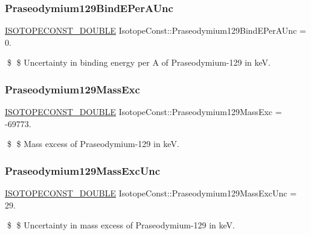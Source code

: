 \subsubsection{\texorpdfstring{Praseodymium129\+Bind\+E\+Per\+A\+Unc}{Praseodymium129BindEPerAUnc}}
{\footnotesize\ttfamily \mbox{\hyperlink{group___isotope_const-_macros_ga8f45a7272ce02c0b4c65c44636ed719a}{I\+S\+O\+T\+O\+P\+E\+C\+O\+N\+S\+T\+\_\+\+D\+O\+U\+B\+LE}} Isotope\+Const\+::\+Praseodymium129\+Bind\+E\+Per\+A\+Unc = 0.}

\$ \$ Uncertainty in binding energy per A of Praseodymium-\/129 in keV. \mbox{\label{group___isotope_const-_praseodymium-_pr129_gaf398c78a06831234ea2d2b014be75fe1}} 
\subsubsection{\texorpdfstring{Praseodymium129\+Mass\+Exc}{Praseodymium129MassExc}}
{\footnotesize\ttfamily \mbox{\hyperlink{group___isotope_const-_macros_ga8f45a7272ce02c0b4c65c44636ed719a}{I\+S\+O\+T\+O\+P\+E\+C\+O\+N\+S\+T\+\_\+\+D\+O\+U\+B\+LE}} Isotope\+Const\+::\+Praseodymium129\+Mass\+Exc = -\/69773.}

\$ \$ Mass excess of Praseodymium-\/129 in keV. \mbox{\label{group___isotope_const-_praseodymium-_pr129_ga3c020c176d54ed8c78d8c996d40be03a}} 
\subsubsection{\texorpdfstring{Praseodymium129\+Mass\+Exc\+Unc}{Praseodymium129MassExcUnc}}
{\footnotesize\ttfamily \mbox{\hyperlink{group___isotope_const-_macros_ga8f45a7272ce02c0b4c65c44636ed719a}{I\+S\+O\+T\+O\+P\+E\+C\+O\+N\+S\+T\+\_\+\+D\+O\+U\+B\+LE}} Isotope\+Const\+::\+Praseodymium129\+Mass\+Exc\+Unc = 29.}

\$ \$ Uncertainty in mass excess of Praseodymium-\/129 in keV. \mbox{\label{group___isotope_const-_praseodymium-_pr129_ga1844a6786916ef69ed3b518ed0ea49c7}} 
